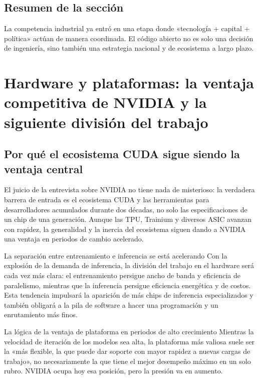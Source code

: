 \documentclass[a4paper]{article}
\begin{document}
\subsection{Resumen de la sección}

La competencia industrial ya entró en una etapa donde «tecnología + capital + política» actúan de manera coordinada. El código abierto no es solo una decisión de ingeniería, sino también una estrategia nacional y de ecosistema a largo plazo.
\section{Hardware y plataformas: la ventaja competitiva de NVIDIA y la siguiente división del trabajo}

\subsection{Por qué el ecosistema CUDA sigue siendo la ventaja central}

El juicio de la entrevista sobre NVIDIA no tiene nada de misterioso: la verdadera barrera de entrada es el ecosistema CUDA y las herramientas para desarrolladores acumulados durante dos décadas, no solo las especificaciones de un chip de una generación. Aunque las TPU, Trainium y diversos ASIC avanzan con rapidez, la generalidad y la inercia del ecosistema siguen dando a NVIDIA una ventaja en periodos de cambio acelerado.

\begin{knowledgebox}{La separación entre entrenamiento e inferencia se está acelerando}
Con la explosión de la demanda de inferencia, la división del trabajo en el hardware será cada vez más clara: el entrenamiento persigue ancho de banda y eficiencia de paralelismo, mientras que la inferencia persigue eficiencia energética y de costos. Esta tendencia impulsará la aparición de más chips de inferencia especializados y también obligará a la pila de software a hacer una programación y un enrutamiento más finos.
\end{knowledgebox}

\begin{importantbox}{La lógica de la ventaja de plataforma en periodos de alto crecimiento}
Mientras la velocidad de iteración de los modelos sea alta, la plataforma más valiosa suele ser la «más flexible, la que puede dar soporte con mayor rapidez a nuevas cargas de trabajo», no necesariamente la que tiene el mejor desempeño máximo en un solo rubro. NVIDIA ocupa hoy esa posición, pero la presión va en aumento.
\end{importantbox}
\end{document}
